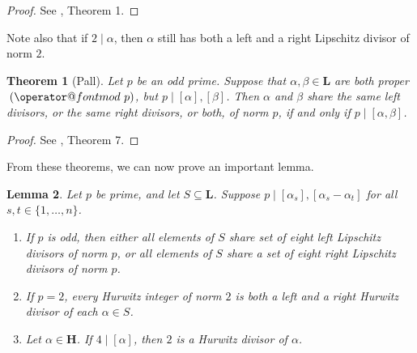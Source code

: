 \documentclass[10pt]{amsart}
\makeatletter
\renewcommand{\L}{\mathbf{L}}
\newcommand{\HH}{\mathbf{H}}
\newcommand{\norm}[1]{\left[#1\right]}
\newtheorem{thm}{Theorem}
\newtheorem{lem}[thm]{Lemma}
\DeclareRobustCommand{\pmod}{\@pmods}
\def\@pmods#1{\mkern4mu({\operator@font mod}\mkern 6mu#1)}
\makeatother
\begin{document}
\begin{proof}
See \cite{Pa40}, Theorem 1.
\end{proof}

\noindent Note also that if $2 \mid \alpha$, then $\alpha$ still has both a left and a right Lipschitz divisor of norm $2$.

\begin{thm}[Pall] \label{thm:Pall}
\normalfont
Let $p$ be an odd prime.  Suppose that $\alpha, \beta \in \L$ are both proper $\pmod{p}$, but $p \mid \norm{\alpha}, \norm{\beta}$.  Then $\alpha$ and $\beta$ share the same left divisors, or the same right divisors, or both, of norm $p$, if and only if $p \mid \norm{\alpha, \beta}$.
\end{thm}

\begin{proof}
See \cite{Pa40}, Theorem 7.
\end{proof}
\noindent
From these theorems, we can now prove an important lemma.

\begin{lem}
\normalfont
Let $p$ be prime, and let $S \subseteq \L$.  Suppose $p \mid \norm{\alpha_s}, \norm{\alpha_s - \alpha_t}$ for all $s,t \in \{1,\dots, n\}$.
\begin{enumerate}
\item If $p$ is odd, then either all elements of $S$ share set of eight left Lipschitz divisors of norm $p$, or all elements of $S$ share a set of eight right Lipschitz divisors of norm $p$.

\item If $p=2$, every Hurwitz integer of norm $2$ is both a left and a right Hurwitz divisor of each $\alpha \in S$.

\item Let $\alpha \in \HH$.  If $4 \mid \norm{\alpha}$, then $2$ is a Hurwitz divisor of $\alpha$.
\end{enumerate}

\end{lem}
\end{document}
